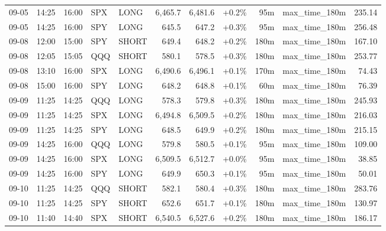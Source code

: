 \documentclass[11pt,a4paper,twoside]{article}
\begin{document}
\begin{center}
\begin{longtable}{>{\color{txtmain}}l l l l l r r r r >{\color{txtmain}}l r}
09-05 & 14:25 & 16:00 & SPX & LONG & 6,465.7 & 6,481.6 & \textcolor{wingreen}{+0.2\%} & 95m & max\_time\_180m & \textcolor{wingreen}{235.14} \\
09-05 & 14:25 & 16:00 & SPY & LONG & 645.5 & 647.2 & \textcolor{wingreen}{+0.3\%} & 95m & max\_time\_180m & \textcolor{wingreen}{256.48} \\
09-08 & 12:00 & 15:00 & SPY & SHORT & 649.4 & 648.2 & \textcolor{wingreen}{+0.2\%} & 180m & max\_time\_180m & \textcolor{wingreen}{167.10} \\
09-08 & 12:05 & 15:05 & QQQ & SHORT & 580.1 & 578.5 & \textcolor{wingreen}{+0.3\%} & 180m & max\_time\_180m & \textcolor{wingreen}{253.77} \\
09-08 & 13:10 & 16:00 & SPX & LONG & 6,490.6 & 6,496.1 & \textcolor{wingreen}{+0.1\%} & 170m & max\_time\_180m & \textcolor{wingreen}{74.43} \\
09-08 & 15:00 & 16:00 & SPY & LONG & 648.2 & 648.8 & \textcolor{wingreen}{+0.1\%} & 60m & max\_time\_180m & \textcolor{wingreen}{76.39} \\
09-09 & 11:25 & 14:25 & QQQ & LONG & 578.3 & 579.8 & \textcolor{wingreen}{+0.3\%} & 180m & max\_time\_180m & \textcolor{wingreen}{245.93} \\
09-09 & 11:25 & 14:25 & SPX & LONG & 6,494.8 & 6,509.5 & \textcolor{wingreen}{+0.2\%} & 180m & max\_time\_180m & \textcolor{wingreen}{216.03} \\
09-09 & 11:25 & 14:25 & SPY & LONG & 648.5 & 649.9 & \textcolor{wingreen}{+0.2\%} & 180m & max\_time\_180m & \textcolor{wingreen}{215.15} \\
09-09 & 14:25 & 16:00 & QQQ & LONG & 579.8 & 580.5 & \textcolor{wingreen}{+0.1\%} & 95m & max\_time\_180m & \textcolor{wingreen}{109.00} \\
09-09 & 14:25 & 16:00 & SPX & LONG & 6,509.5 & 6,512.7 & \textcolor{wingreen}{+0.0\%} & 95m & max\_time\_180m & \textcolor{wingreen}{38.85} \\
09-09 & 14:25 & 16:00 & SPY & LONG & 649.9 & 650.3 & \textcolor{wingreen}{+0.1\%} & 95m & max\_time\_180m & \textcolor{wingreen}{50.01} \\
09-10 & 11:25 & 14:25 & QQQ & SHORT & 582.1 & 580.4 & \textcolor{wingreen}{+0.3\%} & 180m & max\_time\_180m & \textcolor{wingreen}{283.76} \\
09-10 & 11:25 & 14:25 & SPY & SHORT & 652.6 & 651.7 & \textcolor{wingreen}{+0.1\%} & 180m & max\_time\_180m & \textcolor{wingreen}{130.97} \\
09-10 & 11:40 & 14:40 & SPX & SHORT & 6,540.5 & 6,527.6 & \textcolor{wingreen}{+0.2\%} & 180m & max\_time\_180m & \textcolor{wingreen}{186.17} \\

\end{longtable}
\end{center}
\end{document}

